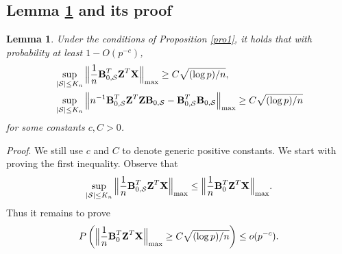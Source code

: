 \documentclass[11pt]{article}
\newtheorem{lemma}{Lemma}%
\newcommand{\bB}{\mbox{\bf B}}
\newcommand{\bX}{\mbox{\bf X}}
\newcommand{\bZ}{\mbox{\bf Z}}
\begin{document}
\subsection{Lemma \ref{lem:3-prime} and its proof} \label{appB.6}

\begin{lemma}\label{lem:3-prime}
	Under the conditions of Proposition \ref{pro1}, it holds that with probability at least $1-O(p^{-c})$,
	\begin{align*}
	&\sup_{|\mathcal S| \leq K_n}	\Big\|\frac{1}{n}\bB_{0,\mathcal{S}}^T\bZ^T \bX \Big\|_{\max} \geq C\sqrt{(\log p)/n},\\
	&\sup_{|\mathcal S| \leq K_n}
	\Big\| n^{-1} \bB_{0,\mathcal{S}}^T\bZ^T \bZ \bB_{0,\mathcal{S}} - \bB_{0,\mathcal{S}}^T \bB_{0,\mathcal{S}}  \Big\|_{\max} \geq C\sqrt{(\log p)/n}
	\end{align*}
for some constants $c, C > 0$.
\end{lemma}

\noindent \textit{Proof}. We still use $c$ and $C$ to denote generic positive constants. We start with proving the first inequality. Observe that
\[
	\sup_{|\mathcal S| \leq K_n}	\Big\|\frac{1}{n}\bB_{0,\mathcal{S}}^T\bZ^T \bX \Big\|_{\max} \leq 	\Big\|\frac{1}{n}\bB_{0}^T\bZ^T \bX \Big\|_{\max}.
\]
Thus it remains to prove
\begin{align}\label{eq: e065}
P\left(	\Big\|\frac{1}{n}\bB_{0}^T\bZ^T \bX \Big\|_{\max} \geq C\sqrt{(\log p)/n}\right) \leq o(p^{-c}).
\end{align}
\end{document}
